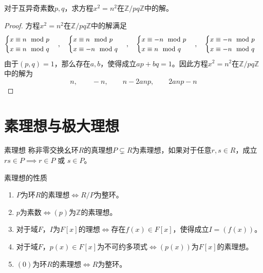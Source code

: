 \documentclass[lang = cn, scheme = chinese, thmcnt = section]{elegantbook}
\begin{document}
\begin{proposition}
	对于互异奇素数$p,q$，求方程$x^2=n^2$在$\mathbb{Z}/pq\mathbb{Z}$中的解。
\end{proposition}

\begin{proof}
	方程$x^2=n^2$在$\mathbb{Z}/pq\mathbb{Z}$中的解满足
	$$
	\small{
		\begin{cases}
			x\equiv n\mod p\\
			x\equiv n\mod q
		\end{cases},\quad 
		\begin{cases}
			x\equiv n\mod p\\
			x\equiv -n\mod q
		\end{cases},\quad 
		\begin{cases}
			x\equiv -n\mod p\\
			x\equiv n\mod q
		\end{cases},\quad 
		\begin{cases}
			x\equiv -n\mod p\\
			x\equiv -n\mod q
		\end{cases}
	}
	$$
	由于$(p,q)=1$，那么存在$a,b$，使得成立$ap+bq=1$。因此方程$x^2=n^2$在$\mathbb{Z}/pq\mathbb{Z}$中的解为
	$$
	n,\qquad -n,\qquad n-2anp,\qquad 2anp-n
	$$
\end{proof}

\section{素理想与极大理想}

\begin{definition}{素理想}
	称非零交换幺环$R$的真理想$P\subsetneq R$为素理想，如果对于任意$r,s\in R$，成立$rs\in P\implies r\in P\text{ 或 }s\in P$。
\end{definition}

\begin{proposition}{素理想的性质}
	\begin{enumerate}
		\item $P$为环$R$的素理想$\iff R/P$为整环。
		\item $p$为素数$\iff (p)$为$\mathbb{Z}$的素理想。
		\item 对于域$F$，$I$为$F[x]$的理想$\iff$存在$f(x)\in F[x]$，使得成立$I=(f(x))$。
		\item 对于域$F$，$p(x)\in F[x]$为不可约多项式$\iff (p(x))$为$F[x]$的素理想。
		\item $(0)$为环$R$的素理想$\iff R$为整环。
	\end{enumerate}
\end{proposition}
\end{document}
